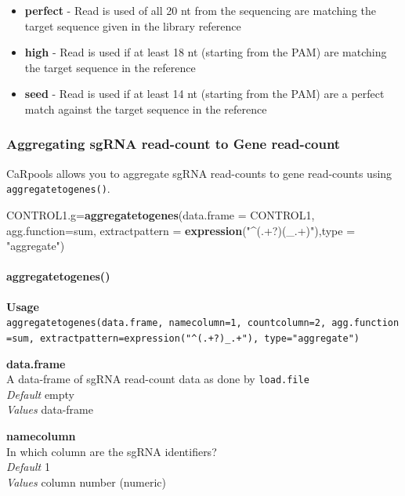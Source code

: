 \documentclass[]{article}
\newenvironment{Shaded}{\begin{snugshade}}{\end{snugshade}}
\newcommand{\KeywordTok}[1]{\textcolor[rgb]{0.13,0.29,0.53}{\textbf{{#1}}}}
\newcommand{\DataTypeTok}[1]{\textcolor[rgb]{0.13,0.29,0.53}{{#1}}}
\newcommand{\StringTok}[1]{\textcolor[rgb]{0.31,0.60,0.02}{{#1}}}
\newcommand{\NormalTok}[1]{{#1}}
\providecommand{\tightlist}{%
  \setlength{\itemsep}{0pt}\setlength{\parskip}{0pt}}
\let\oldparagraph\paragraph
\renewcommand{\paragraph}[1]{\oldparagraph{#1}\mbox{}}
\begin{document}
\begin{itemize}
\tightlist
\item
  \textbf{perfect} - Read is used of all 20 nt from the sequencing are
  matching the target sequence given in the library reference
\item
  \textbf{high} - Read is used if at least 18 nt (starting from the PAM)
  are matching the target sequence in the reference
\item
  \textbf{seed} - Read is used if at least 14 nt (starting from the PAM)
  are a perfect match against the target sequence in the reference
\end{itemize}

\subsubsection{Aggregating sgRNA read-count to Gene
read-count}\label{aggregating-sgrna-read-count-to-gene-read-count}

CaRpools allows you to aggregate sgRNA read-counts to gene read-counts
using \texttt{aggregatetogenes()}.

\begin{Shaded}
\begin{Highlighting}[]
\NormalTok{CONTROL1.g=}\KeywordTok{aggregatetogenes}\NormalTok{(}\DataTypeTok{data.frame =} \NormalTok{CONTROL1, }\DataTypeTok{agg.function=}\NormalTok{sum,}
        \DataTypeTok{extractpattern =} \KeywordTok{expression}\NormalTok{(}\StringTok{"^(.+?)(_.+)"}\NormalTok{),}\DataTypeTok{type =} \StringTok{"aggregate"}\NormalTok{)}
\end{Highlighting}
\end{Shaded}

\paragraph{aggregatetogenes()}\label{aggregatetogenes}

\textbf{Usage}\\
\texttt{aggregatetogenes(data.frame,\ namecolumn=1,\ countcolumn=2,\ agg.function=sum,\ extractpattern=expression("\^{}(.+?)\_.+"),\ type="aggregate")}

\textbf{data.frame}\\
A data-frame of sgRNA read-count data as done by \texttt{load.file}\\
\emph{Default} empty\\
\emph{Values} data-frame

\textbf{namecolumn}\\
In which column are the sgRNA identifiers?\\
\emph{Default} 1\\
\emph{Values} column number (numeric)
\end{document}
